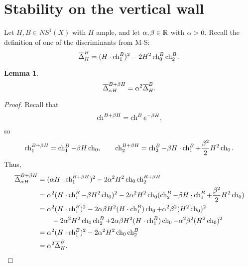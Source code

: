 \documentclass[letterpaper,10pt]{article}
\newtheorem{lem}[thm]{Lemma}
\begin{document}
\section{Stability on the vertical wall}
Let $H, B \in NS^1(X)$ with $H$ ample, and let $\al, \be \in \R$ with $\al > 0$. Recall the definition of one of the discriminants from M-S:
\[ \overline{\Delta}^B_H = (H \cdot \ch_1^B)^2 - 2 H^2 \ch_0^B \ch_2^B. \]
\begin{lem}
    \[ \overline{\Delta}^{B + \be H}_{\al H} = \al^2 \overline{\Delta}^B_H. \]
\end{lem}
\begin{proof}
    Recall that
    \[ \ch^{B + \be H} = \ch^B e^{-\be H}, \]
    so
    \[ \ch_1^{B + \be H} = \ch_1^B - \be H \ch_0, \qquad \ch_2^{B + \be H} = \ch_2^B - \be H \cdot \ch_1^B + \frac{\be^2}{2} H^2 \ch_0. \]
    Thus,
    \begin{align*}
        \overline{\Delta}^{B + \be H}_{\al H} & = (\al H \cdot \ch_1^{B + \be H})^2 - 2 \al^2 H^2 \ch_0 \ch_2^{B + \be H} \\
        & = \al^2 (H \cdot \ch_1^B - \be H^2 \ch_0)^2 - 2 \al^2 H^2 \ch_0 (\ch_2^B - \be H \cdot \ch_1^B + \frac{\be^2}{2} H^2 \ch_0) \\ 
        & = \al^2 (H \cdot \ch_1^B)^2 - 2 \al \be H^2 (H \cdot \ch_1^B) \ch_0 + \al^2 \be^2 (H^2 \ch_0)^2 \\ 
        & \qquad - 2 \al^2 H^2 \ch_0 \ch_2^B + 2 \al \be H^2 (H \cdot \ch_1^B) \ch_0 - \al^2 \be^2 (H^2 \ch_0)^2 \\
        & = \al^2 (H \cdot \ch_1^B)^2 - 2 \al^2 H^2 \ch_0 \ch_2^B \\
        & = \al^2 \overline{\Delta}_H^B.
    \end{align*}
\end{proof}
\end{document}
